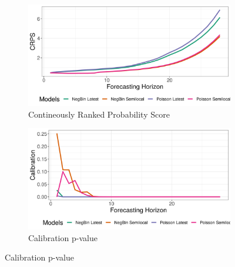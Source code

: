 \begin{figure}[H]
\begin{subfigure}{0.5\textwidth}
  \centering
  \includegraphics[width=\linewidth]{../output/Mabalako_crps.png}  
  \caption{Contineously Ranked Probability Score}
  \label{Mabalako_scores_1}
\end{subfigure}
\begin{subfigure}{0.5\textwidth}
  \centering
  \includegraphics[width=\linewidth]{../output/Mabalako_calibration.png}  
  \caption{Calibration p-value}
  \label{Mabalako_scores_2}
\end{subfigure}


\end{figure}
